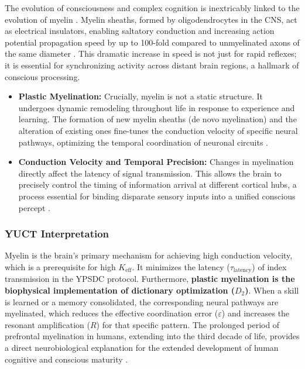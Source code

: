 \documentclass[12pt,a4paper]{article}
\begin{document}
	The evolution of consciousness and complex cognition is inextricably linked to the evolution of myelin \cite{Fields2008}. Myelin sheaths, formed by oligodendrocytes in the CNS, act as electrical insulators, enabling saltatory conduction and increasing action potential propagation speed by up to 100-fold compared to unmyelinated axons of the same diameter \cite{Waxman1980}. This dramatic increase in speed is not just for rapid reflexes; it is essential for synchronizing activity across distant brain regions, a hallmark of conscious processing.
	
	\begin{itemize}
		\item \textbf{Plastic Myelination:} Crucially, myelin is not a static structure. It undergoes dynamic remodeling throughout life in response to experience and learning. The formation of new myelin sheaths (de novo myelination) and the alteration of existing ones fine-tunes the conduction velocity of specific neural pathways, optimizing the temporal coordination of neuronal circuits \cite{deFaria2021, Monje2023}.
		\item \textbf{Conduction Velocity and Temporal Precision:} Changes in myelination directly affect the latency of signal transmission. This allows the brain to precisely control the timing of information arrival at different cortical hubs, a process essential for binding disparate sensory inputs into a unified conscious percept \cite{Pajevic2014}.
	\end{itemize}
	
	\subsubsection*{YUCT Interpretation}
	Myelin is the brain's primary mechanism for achieving high conduction velocity, which is a prerequisite for high \(K_{\mathrm{eff}}\). It minimizes the latency (\(\tau_{\text{latency}}\)) of index transmission in the YPSDC protocol. Furthermore, \textbf{plastic myelination is the biophysical implementation of dictionary optimization (\(D_2\))}. When a skill is learned or a memory consolidated, the corresponding neural pathways are myelinated, which reduces the effective coordination error (\(\varepsilon\)) and increases the resonant amplification (\(R\)) for that specific pattern. The prolonged period of prefrontal myelination in humans, extending into the third decade of life, provides a direct neurobiological explanation for the extended development of human cognitive and conscious maturity \cite{Miller2012, Fields2015}.
	
\end{document}
